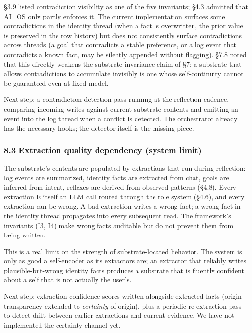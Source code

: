 \documentclass[11pt,letterpaper]{article}
\begin{document}
§3.9 listed contradiction visibility as one of the five invariants; §4.3 admitted that AI\_OS only partly enforces it. The current implementation surfaces some contradictions in the identity thread (when a fact is overwritten, the prior value is preserved in the row history) but does not consistently surface contradictions across threads (a goal that contradicts a stable preference, or a log event that contradicts a known fact, may be silently appended without flagging). §7.8 noted that this directly weakens the substrate-invariance claim of §7: a substrate that allows contradictions to accumulate invisibly is one whose self-continuity cannot be guaranteed even at fixed model.

Next step: a contradiction-detection pass running at the reflection cadence, comparing incoming writes against current substrate contents and emitting an event into the log thread when a conflict is detected. The orchestrator already has the necessary hooks; the detector itself is the missing piece.

\subsubsection*{8.3 Extraction quality dependency (system limit)}

The substrate's contents are populated by extractions that run during reflection: log events are summarized, identity facts are extracted from chat, goals are inferred from intent, reflexes are derived from observed patterns (§4.8). Every extraction is itself an LLM call routed through the role system (§4.6), and every extraction can be wrong. A bad extraction writes a wrong fact; a wrong fact in the identity thread propagates into every subsequent read. The framework's invariants (I3, I4) make wrong facts auditable but do not prevent them from being written.

This is a real limit on the strength of substrate-located behavior. The system is only as good a self-encoder as its extractors are; an extractor that reliably writes plausible-but-wrong identity facts produces a substrate that is fluently confident about a self that is not actually the user's.

Next step: extraction confidence scores written alongside extracted facts (origin transparency extended to \emph{certainty} of origin), plus a periodic re-extraction pass to detect drift between earlier extractions and current evidence. We have not implemented the certainty channel yet.
\end{document}
